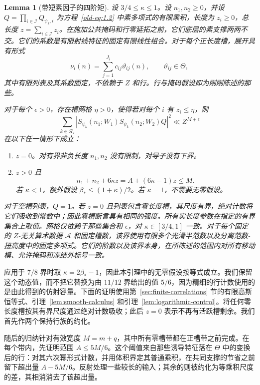 \documentclass[11pt,a4paper]{article}
\numberwithin{equation}{section}
\numberwithin{figure}{section}
\newtheorem{lemma}[theorem]{Lemma}
\theoremstyle{definition}
\theoremstyle{remark}
\begin{document}
\begin{lemma}[带短素因子的四阶矩]\label{lem:plain}
设 \(3/4\le\kappa\le1\)。设 \(n_1,n_2\ge0\)，并设 \(Q=\prod_{i\in\mathcal I}Q_{\psi_k,i}\) 为方程~\eqref{old-eq:1.2} 中素多项式的有限乘积，长度为 \(z_i\ge0\)，总长度 \(z=\sum_{i\in\mathcal I}z_i\)。在施加公共掩码和行零延拓之前，它们底层的素支撑两两不交。它们的系数是有限射线特征的固定有限线性组合。对于每个正长度槽，展开具有形式
\[
 \nu_i(n)=\sum_{j=1}^{J_i}c_{ij}\vartheta_{ij}(n),
 \qquad \vartheta_{ij}\in\Theta,
\]
其中有限列表及其系数固定，不依赖于 \(Z\) 和行。行与掩码假设即为刚刚陈述的那些。

对于每个 \(\epsilon>0\)，存在槽网格 \(\eta>0\)，使得若对每个 \(i\) 有 \(z_i\le\eta\)，则
\begin{equation}
 \sum_{k\in\mathcal R_z}
 \left|S_{\psi_k}(n_1;W_1)S_{\psi_k}(n_2;W_2)Q\right|^2
 \ll Z^{M+\epsilon}
 \label{old-eq:2.1}
\end{equation}
在以下任一情形下成立：
\begin{enumerate}
\item \(z=0\)。对有界非负长度 \(n_1,n_2\) 没有限制，对导子没有下界。
\item \(z>0\) 且
\begin{equation}
 n_1+n_2+6\kappa z=A+(6\kappa-1)z\le M.
 \label{old-eq:3.9}
\end{equation}
      若 \(\kappa<1\)，额外假设 \(\beta_*\le(1+\kappa)/2\)。若 \(\kappa=1\)，不需要无零假设。
\end{enumerate}
对于空槽列表，\(Q=1\)。若 \(z=0\) 且列表包含零长度槽，其尺度有界，绝对计数将它们吸收到常数中；因此零槽断言具有相同的强度。所有实长度参数在指定的有界集合上取值。网格仅依赖于那些集合和 \(\epsilon\)，对 \(\kappa\in[3/4,1]\) 一致。对于每个固定的 \(Z\)-无关算术数据 \(\mathcal A\) 和固定槽数，该界使用有限多个光滑半范数以及分离范数-扭高度中的固定多项式。它们的阶数以及该界本身，在所陈述的范围内对所有移动模、允许掩码和冻结外标号一致。
\end{lemma}应用于 \(7/8\) 界时取 \(\kappa=2\beta_*-1\)，因此本引理中的无零假设按等式成立。我们保留这个动态值，而不把它替换为由 \(11/12\) 界给出的值 \(5/6\)，因为精细的行计数使用的是由此得到的仿射容量。下面的证明使用第~\ref{sec:finite-correlations} 节的有限高斯恒等式、引理~\ref{lem:smooth-calculus} 和引理~\ref{lem:logarithmic-control}。将任何零长度槽按其有界尺度通过绝对计数吸收；此后 \(z=0\) 表示不再有活跃槽剩余。我们首先作两个保持行族的约化。

随后的归纳针对有效宽度 \(M=m+q\)，其中所有零槽带都在正槽带之前完成。在每个带内，先证明范围 \(A\le5M/6\)。这个阈值来自那些诱导特征落在 \(\Theta\) 中的变换后的行：对其六次幂形式计数，并用体积界定其普通乘积，在共同支撑的节省之前留下超出量 \(A-5M/6\)。反射处理一些较长的输入；其余的则被约化为等乘积尺度的差，其相消消去了该超出量。
\end{document}
